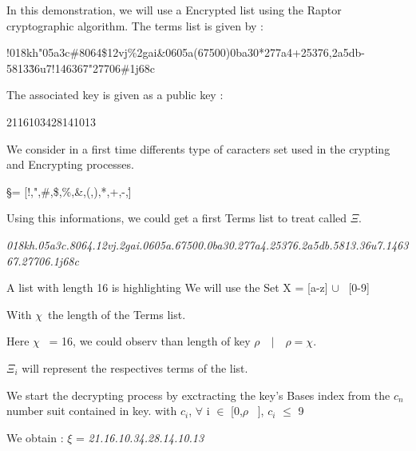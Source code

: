 \documentclass[letterpaper,10pt,english]{sphinxmanual}
\begin{document}
\begin{flushleft}
In this demonstration, we will use a Encrypted list using the Raptor cryptographic algorithm.
The terms list is given by :
\end{flushleft}

\begin{center}
!018kh"05a3c\#8064\$12vj\%2gai\&0605a(67500)0ba30*277a4+25376,2a5db-5813\.36u7!146367"27706\#1j68c
\end{center}

\begin{flushleft}
The associated key is given as a public key : 
\end{flushleft}

\begin{center}
2116103428141013
\end{center}

\begin{flushleft}
We consider in a first time differents type of caracters set used in the crypting and Encrypting processes.
\end{flushleft}

\begin{center}
\S = [!,",\#,\$,\%,\&,(,),*,+,-,\.]
\end{center}

Using this informations, we could get a first Terms list to treat called $ \Xi $.

\begin{center}
\textit{018kh.05a3c.8064.12vj.2gai.0605a.67500.0ba30.277a4.25376.2a5db.5813.36u7.146367.27706.1j68c}
\end{center}


\begin{flushleft}
  A list with length 16 is highlighting
We will use the Set X  = [a-z] $ \cup $  \ [0-9]

With $ \chi $\ the length of the Terms list.

Here $ \chi $ \ = 16, we could observ than length of key $ \rho  \quad  \vert \quad  \rho  = \chi . $

$ \Xi_{i} $ will represent the respectives terms of the list.

We start the decrypting process by exctracting the key's Bases index from the $c_{n}$ number suit contained in key.
with $ c_{i} $, $ \forall $ i $ \in $ [0,$ \rho $ \ ], $ c_{i} $ $\leq $ 9

\end{flushleft}

\begin{center}
We obtain : $\xi $ = \textit{21.16.10.34.28.14.10.13}
\end{center}
\newpage
\end{document}
